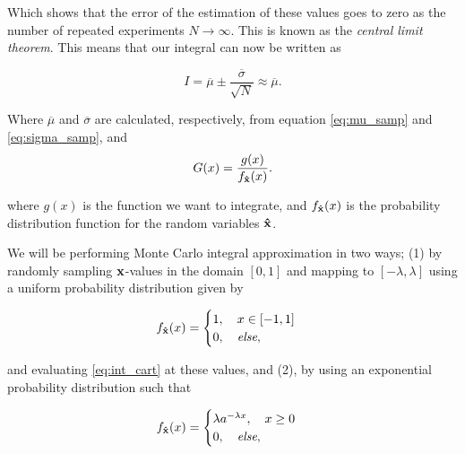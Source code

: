 \documentclass[a4paper,10pt,english]{article}
\begin{document}
Which shows that the error of the estimation of these values goes to zero as the number of repeated experiments $N \rightarrow \infty$. This is known as the \textit{central limit theorem}. This means that our integral can now be written as

$$I = \overline{\mu} \pm \frac{\overline{\sigma}}{\sqrt{N}} \approx \overline{\mu}.$$

Where $\overline{\mu}$ and $\overline{\sigma}$ are calculated, respectively, from equation \ref{eq:mu_samp} and \ref{eq:sigma_samp}, and 
$$G(x) = \frac{g(x)}{f_\bold{\hat{x}}(x)}.$$

where $g(x)$ is the function we want to integrate, and $f_\bold{\hat{x}}(x)$ is the probability distribution function for the random variables $\bold{\hat{x}}$. 


We will be performing Monte Carlo integral approximation in two ways; (1) by randomly sampling $\bold{x}$-values in the domain $[0, 1]$ and mapping to $[-\lambda, \lambda]$ using a uniform probability distribution given by

\[ {f_\bold{\hat{x}}(x)} = \begin{cases} 
1, \quad x \in [-1, 1] \\
0, \quad \textit{else},
\end{cases} \]

and evaluating \ref{eq:int_cart} at these values, and (2), by using an exponential probability distribution such that 

\[ {f_\bold{\hat{x}}(x)} = \begin{cases} 
\lambda a^{-\lambda x}, \quad x \geq 0 \\
0, \quad \textit{else}, 
\end{cases} \]
\end{document}
